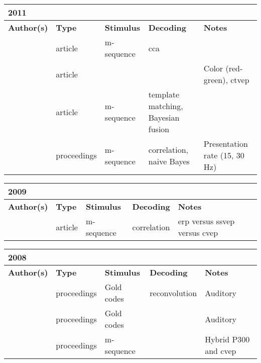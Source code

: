\documentclass[a4paper,landscape]{article}
\begin{document}
\begin{table}[H]
	\begin{tabular}{p{5cm}p{2cm}p{5cm}p{5cm}p{6.5cm}}
		\textbf{2011} & & & & \\
		\toprule
		\textbf{Author(s)} & \textbf{Type} & \textbf{Stimulus} & \textbf{Decoding} & \textbf{Notes} \\
		\midrule
		\citeauthor{bin2011} & article & m-sequence & \acrshort{cca} & \\
		\citeauthor{lai2011} & article & & & Color (red-green), \acrshort{ctvep} \\
		\citeauthor{nezamfar2011a} & article & m-sequence & template matching, Bayesian fusion & \\
		\citeauthor{nezamfar2011b} & proceedings & m-sequence & correlation, naive Bayes & Presentation rate (15, 30 Hz) \\
		\bottomrule
	\end{tabular}
\end{table}

\begin{table}[H]
	\begin{tabular}{p{5cm}p{2cm}p{5cm}p{5cm}p{6.5cm}}
		\textbf{2009} & & & & \\
		\toprule
		\textbf{Author(s)} & \textbf{Type} & \textbf{Stimulus} & \textbf{Decoding} & \textbf{Notes} \\
		\midrule
		\citeauthor{bin2009} & article & m-sequence & correlation & \acrshort{erp} versus \acrshort{ssvep} versus \acrshort{cvep} \\
		\bottomrule
	\end{tabular}
\end{table}

\begin{table}[H]
	\begin{tabular}{p{5cm}p{2cm}p{5cm}p{5cm}p{6.5cm}}
		\textbf{2008} & & & & \\
		\toprule
		\textbf{Author(s)} & \textbf{Type} & \textbf{Stimulus} & \textbf{Decoding} & \textbf{Notes} \\
		\midrule
		\citeauthor{desain2008} & proceedings & Gold codes & reconvolution & Auditory \\
		\citeauthor{farquhar2008} & proceedings & Gold codes & & Auditory \\
		\citeauthor{momose2008} & proceedings & m-sequence & & Hybrid P300 and \acrshort{cvep} \\
		\bottomrule
	\end{tabular}
\end{table}
\end{document}
